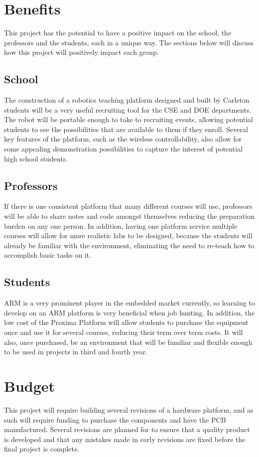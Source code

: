 \documentclass[letterpaper]{article}
\begin{document}
\pagebreak
\section{Benefits}
This project has the potential to have a positive impact on the school, the professors and the students, each in a unique way. The sections below will discuss how this project will positively impact each group.

\subsection{School}
The construction of a robotics teaching platform designed and built by Carleton students will be a very useful recruiting tool for the CSE and DOE departments. The robot will be portable enough to take to recruiting events, allowing potential students to see the possibilities that are available to them if they enroll. Several key features of the platform, such as the wireless controllability, also allow for some appealing demonstration possibilities to capture the interest of potential high school students.

\subsection{Professors}
If there is one consistent platform that many different courses will use, professors will be able to share notes and code amongst themselves reducing the preparation burden on any one person. In addition, having one platform service multiple courses will allow for more realistic labs to be designed, because the students will already be familiar with the environment, eliminating the need to re-teach how to accomplish basic tasks on it. 
\subsection{Students}
ARM is a very prominent player in the embedded market currently, so learning to develop on an ARM platform is very beneficial when job hunting. In addition, the low cost of the Proxima Platform will allow students to purchase the equipment once and use it for several courses, reducing their term over term costs. It will also, once purchased, be an environment that will be familiar and flexible enough to be used in projects in third and fourth year.
\section{Budget}
This project will require building several revisions of a hardware platform, and as such will require funding to purchase the components and have the PCB manufactured. Several revisions are planned for to ensure that a quality product is developed and that any mistakes made in early revisions are fixed before the final project is complete.
\end{document}
